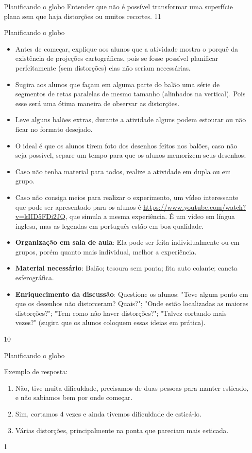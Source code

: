 \begin{objectives}{Planificando o globo}
{
  Entender que não é possível transformar uma superfície plana sem que haja distorções ou muitos recortes.
}{1}{1}
\end{objectives}
\clearmargin
\begin{sugestions}{Planificando o globo}
{
  \begin{itemize}
  \item Antes de começar, explique aos alunos que a atividade mostra o porquê da existência de projeções cartográficas, pois se fosse possível planificar perfeitamente (sem distorções) elas não seriam necessárias.
  \item Sugira aos alunos que façam em alguma parte do balão uma série de segmentos de retas paralelas de mesmo tamanho (alinhados na vertical). Pois esse será uma ótima maneira de observar as distorções.
  \item Leve alguns balões extras, durante a atividade alguns podem estourar ou não ficar no formato desejado.
  \item O ideal é que  os alunos tirem foto dos desenhos feitos nos balões, caso não seja possível, separe um tempo para que os alunos memorizem seus desenhos;
  \item Caso não tenha material para todos, realize a atividade em dupla ou em grupo.
  \item Caso não consiga meios para realizar o experimento, um vídeo interessante que pode ser apresentado para os alunos é \url{https://www.youtube.com/watch?v=kIID5FDi2JQ}, que simula a mesma experiência. É um vídeo em língua inglesa, mas as legendas em português estão em boa qualidade.
  \item \textbf{Organização em sala de aula}: Ela pode ser feita individualmente ou em grupos, porém quanto mais individual, melhor a experiência.
  \item \textbf{Material necessário}: Balão; tesoura sem ponta; fita auto colante; caneta esferográfica.
  \item\textbf{Enriquecimento da discussão}: Questione os alunos: "Teve algum ponto em que os desenhos não  distorceram? Quais?"; "Onde estão localizadas as maiores distorções?"; "Tem como não haver distorções?"; "Talvez cortando mais vezes?" (sugira que os alunos coloquem essas ideias em prática).
  \end{itemize}
}{1}{0}
\end{sugestions}
\begin{answer}{Planificando o globo}
{
  Exemplo de resposta:
  \begin{enumerate}
  \item Não, tive muita dificuldade, precisamos de duas pessoas para manter esticado, e não sabíamos bem por onde começar.
  \item Sim, cortamos 4 vezes e ainda tivemos dificuldade de esticá-lo.
  \item Várias distorções, principalmente na ponta que pareciam mais esticada.
  \end{enumerate}
}{1}
\end{answer}

